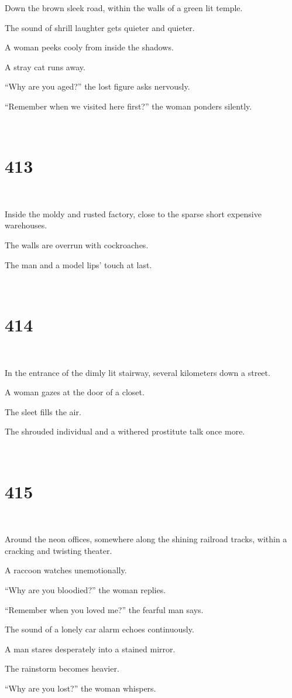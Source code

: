 \documentclass{report}
\begin{document}
Down the brown sleek road, within the walls of a green lit temple.

The sound of shrill laughter gets quieter and quieter.

A woman peeks cooly from inside the shadows.

A stray cat runs away.

``Why are you aged?'' the lost figure asks nervously.

``Remember when we visited here first?'' the woman ponders silently.

~
\chapter*{413}
~

Inside the moldy and rusted factory, close to the sparse short expensive warehouses.

The walls are overrun with cockroaches.

The man and a model lips' touch at last.

~
\chapter*{414}
~

In the entrance of the dimly lit stairway, several kilometers down a street.

A woman gazes at the door of a closet.

The sleet fills the air.

The shrouded individual and a withered prostitute talk once more.

~
\chapter*{415}
~

Around the neon offices, somewhere along the shining railroad tracks, within a cracking and twisting theater.

A raccoon watches unemotionally.

``Why are you bloodied?'' the woman replies.

``Remember when you loved me?'' the fearful man says.

The sound of a lonely car alarm echoes continuously.

A man stares desperately into a stained mirror.

The rainstorm becomes heavier.

``Why are you lost?'' the woman whispers.
\end{document}
